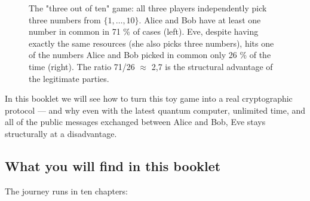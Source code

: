 \documentclass[11pt,a4paper]{article}
\begin{document}
\begin{figure}[h]
\caption{The "three out of ten" game: all three players independently pick three numbers from $\{1, \ldots, 10\}$. Alice and Bob have at least one number in common in 71 \% of cases (left). Eve, despite having exactly the same resources (she also picks three numbers), hits one of the numbers Alice and Bob picked in common only 26 \% of the time (right). The ratio 71/26 $\approx$ 2{,}7 is the structural advantage of the legitimate parties.}
\label{fig:asymmetry}
\end{figure}

In this booklet we will see how to turn this toy game into a real cryptographic protocol --- and why even with the latest quantum computer, unlimited time, and all of the public messages exchanged between Alice and Bob, Eve stays structurally at a disadvantage.

\subsection{What you will find in this booklet}

The journey runs in ten chapters:
\end{document}
